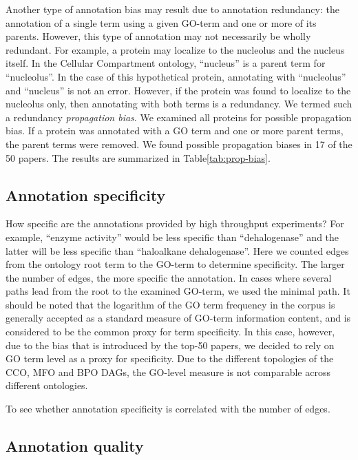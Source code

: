 \documentclass[10pt]{bmc_article}
\newenvironment{bmcformat}{\begin{raggedright}\baselineskip20pt\sloppy\setboolean{publ}{false}}{\end{raggedright}\baselineskip20pt\sloppy}
\begin{document}
\begin{bmcformat}
Another type of annotation bias may result due to annotation redundancy: the annotation of
a single term using a given GO-term and one or more of its parents. However, this type of
annotation may not necessarily be wholly redundant. For example, a protein may localize to
the nucleolus and the nucleus itself. In the Cellular Compartment ontology, ``nucleus'' is
a parent term for ``nucleolus''. In the case of this hypothetical protein, annotating with
``nucleolus'' and ``nucleus'' is not an error. However, if the protein was found to
localize to the nucleolus only, then annotating with both terms is a redundancy. We termed
such a redundancy \textit{propagation bias}. We examined all proteins for possible propagation
bias. If a protein was annotated with a GO term and one or more parent terms, the parent
terms were removed. We found possible propagation biases in 17 of the 50 papers. The results
are summarized in Table\ref{tab:prop-bias}. 

\subsection*{Annotation specificity}

How specific are the annotations provided by high throughput experiments? For example,
``enzyme activity'' would be less specific than ``dehalogenase'' and the latter will be
less specific than ``haloalkane dehalogenase''. Here we counted edges from the ontology
root term to the GO-term to determine specificity. The larger the number of edges, the
more specific the annotation. In cases where several paths lead from the root to the
examined GO-term, we used the minimal path. It should be noted that the logarithm of
the GO term frequency in the corpus is generally accepted as a standard measure of GO-term
information content, and is considered to be the common proxy for term
specificity\cite{lord-semsim}. In this case,
however, due to the bias that is introduced by the top-50 papers, we decided to rely on GO
term level as a proxy for specificity. Due to the different topologies of the CCO, MFO and
BPO DAGs, the GO-level measure is not comparable across different ontologies.

To see whether annotation specificity is correlated with the number of edges. 


\subsection*{Annotation quality}


\end{bmcformat}
\end{document}
